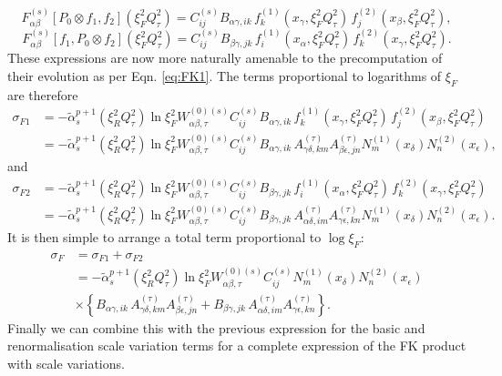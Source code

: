 \documentclass[11pt]{article}
\newcommand{\be}{\begin{equation}}
\newcommand{\ee}{\end{equation}}
\begin{document}
\be \label{eq:deconvsubprocess1} F^{(s)}_{\alpha\beta}[P_0\otimes f_1, f_2](\xi_F^2{Q^2_\tau})= C^{(s)}_{ij} B_{\alpha\gamma, ik} \, 
 f_k^{(1)}(x_\gamma, \xi_F^2Q_\tau^2)\, f_j^{(2)}(x_{\beta},\xi_F^2Q^2_\tau), \ee
\be \label{eq:deconvsubprocess1} F^{(s)}_{\alpha\beta}[f_1, P_0\otimes f_2](\xi_F^2{Q^2_\tau})= C^{(s)}_{ij} B_{\beta\gamma, jk} \, 
 f_i^{(1)}(x_\alpha, \xi_F^2Q_\tau^2)\, f_k^{(2)}(x_{\gamma},\xi_F^2Q^2_\tau). \ee
 These expressions are now more naturally amenable to the precomputation of their evolution as per Eqn. \ref{eq:FK1}. The terms proportional to logarithms of $\xi_F$ are therefore 
 \begin{align}
\sigma_{F1} &=
-\tilde{\alpha}_s^{p+1}(\xi_R^2Q^2_\tau)
\ln \xi_F^2  
W_{\alpha\beta,\tau}^{(0)(s)} C^{(s)}_{ij} B_{\alpha\gamma, ik} \, 
 f_k^{(1)}(x_\gamma, \xi_F^2Q_\tau^2)\, f_j^{(2)}(x_{\beta},\xi_F^2Q^2_\tau) \nonumber \\
 &=
 -\tilde{\alpha}_s^{p+1}(\xi_R^2Q^2_\tau)
\ln \xi_F^2  
W_{\alpha\beta,\tau}^{(0)(s)} C^{(s)}_{ij} B_{\alpha\gamma, ik} \, 
A^{(\tau)}_{\gamma\delta, km} A^{(\tau)}_{\beta\epsilon, jn} N^{(1)}_{m}(x_\delta) N^{(2)}_{n}(x_\epsilon),
 \end{align}
and
\begin{align}
\sigma_{F2} &=
-\tilde{\alpha}_s^{p+1}(\xi_R^2Q^2_\tau) \ln \xi_F^2  
W_{\alpha\beta,\tau}^{(0)(s)} C^{(s)}_{ij} B_{\beta\gamma, jk} \, 
 f_i^{(1)}(x_\alpha, \xi_F^2Q_\tau^2)\, f_k^{(2)}(x_{\gamma},\xi_F^2Q^2_\tau) \nonumber \\
 &=
-\tilde{\alpha}_s^{p+1}(\xi_R^2Q^2_\tau) \ln \xi_F^2  
W_{\alpha\beta,\tau}^{(0)(s)} C^{(s)}_{ij} B_{\beta\gamma, jk} \, 
A^{(\tau)}_{\alpha\delta, im} A^{(\tau)}_{\gamma\epsilon, kn} N^{(1)}_{m}(x_\delta) N^{(2)}_{n}(x_\epsilon).
\end{align}
It is then simple to arrange a total term proportional to $\log \xi_F$:
\begin{align}
\sigma_F &= \sigma_{F1} + \sigma_{F2}\\
&= -\tilde{\alpha}_s^{p+1}(\xi_R^2Q^2_\tau) \ln \xi_F^2  W_{\alpha\beta,\tau}^{(0)(s)} C^{(s)}_{ij} N^{(1)}_{m}(x_\delta) N^{(2)}_{n}(x_\epsilon)\\
&\times \left\{ B_{\alpha\gamma, ik} \, 
A^{(\tau)}_{\gamma\delta, km} A^{(\tau)}_{\beta\epsilon, jn} +  B_{\beta\gamma, jk} \, 
A^{(\tau)}_{\alpha\delta, im} A^{(\tau)}_{\gamma\epsilon, kn}  \right\}.
\end{align}
Finally we can combine this with the previous expression for the basic and renormalisation scale variation terms for a complete expression of the FK product with scale variations.
\end{document}
